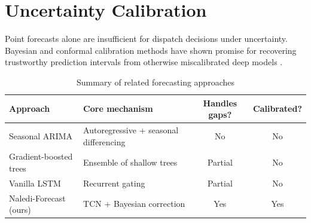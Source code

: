 \section{Uncertainty Calibration}
Point forecasts alone are insufficient for dispatch decisions under uncertainty. Bayesian
and conformal calibration methods have shown promise for recovering trustworthy prediction
intervals from otherwise miscalibrated deep models \cite{gal2016dropout}.

\begin{table}[htbp]
\centering
\caption{Summary of related forecasting approaches}
\label{tab:related-work}
\begin{tabularx}{\linewidth}{@{}lXcc@{}}
\toprule
\textbf{Approach} & \textbf{Core mechanism} & \textbf{Handles gaps?} & \textbf{Calibrated?} \\
\midrule
Seasonal ARIMA & Autoregressive + seasonal differencing & No & No \\
Gradient-boosted trees & Ensemble of shallow trees & Partial & No \\
Vanilla LSTM & Recurrent gating & Partial & No \\
Naledi-Forecast (ours) & TCN + Bayesian correction & Yes & Yes \\
\bottomrule
\end{tabularx}
\end{table}
